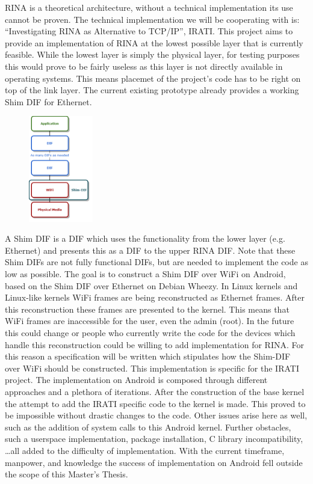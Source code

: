 \begin{slshape}
RINA is a theoretical architecture, without a technical implementation its use cannot be proven. The technical implementation we will be cooperating with is: ``Investigating RINA as Alternative to TCP/IP'', IRATI. This project aims to provide an implementation of RINA at the lowest possible layer that is currently feasible. While the lowest layer is simply the physical layer, for testing purposes this would prove to be fairly useless as this layer is not directly available in operating systems. This means placemet of the project's code has to be right on top of the link layer. The current existing prototype already provides a working Shim DIF for Ethernet. 
\begin{figure}
	\centering
	\includegraphics[width=0.25\textwidth]{figures/rinaoverwifi}
\end{figure}
A Shim DIF is a DIF which uses the functionality from the lower layer (e.g. Ethernet) and presents this as a DIF to the upper RINA DIF. Note that these Shim DIFs are not fully functional DIFs, but are needed to implement the code as low as possible. The goal is to construct a Shim DIF over WiFi on Android, based on the Shim DIF over Ethernet on Debian Wheezy. 
\npar
In Linux kernels and Linux-like kernels WiFi frames are being reconstructed as Ethernet frames. After this reconstruction these frames are presented to the kernel. This means that WiFi frames are inaccessible for the user, even the admin (root). In the future this could change or people who currently write the code for the devices which handle this reconstruction could be willing to add implementation for RINA. For this reason a specification will be written which stipulates how the Shim-DIF over WiFi should be constructed. This implementation is specific for the IRATI project.
\npar
The implementation on Android is composed through different approaches and a plethora of iterations. After the construction of the base kernel the attempt to add the IRATI specific code to the kernel is made. This proved to be impossible without drastic changes to the code. Other issues arise here as well, such as the addition of system calls to this Android kernel. Further obstacles, such a userspace implementation, package installation, C library incompatibility, \ldots all added to the difficulty of implementation. With the current timeframe, manpower, and knowledge the success of implementation on Android fell outside the scope of this Master's Thesis. 




\end{slshape}
